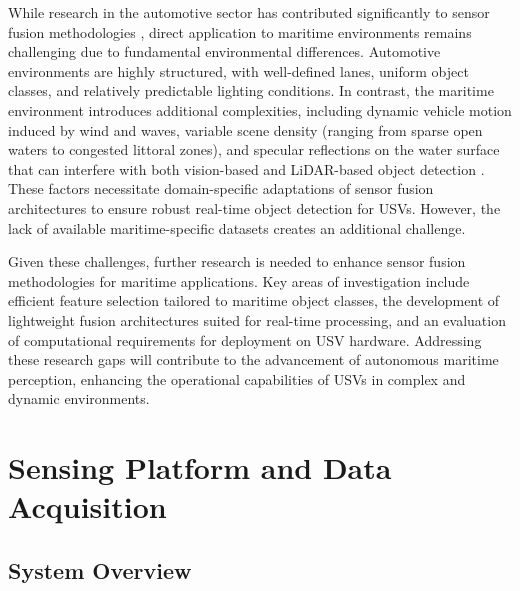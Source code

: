 \documentclass{erauthesis}
\begin{document}
While research in the automotive sector has contributed significantly to sensor fusion methodologies \cite{yeong2021,clunie2021,roriz2022,cui2022,das2022,liu2023a}, direct application to maritime environments remains challenging due to fundamental environmental differences. 
Automotive environments are highly structured, with well-defined lanes, uniform object classes, and relatively predictable lighting conditions. 
In contrast, the maritime environment introduces additional complexities, including dynamic vehicle motion induced by wind and waves, variable scene density (ranging from sparse open waters to congested littoral zones), and specular reflections on the water surface that can interfere with both vision-based \cite{liu2023a} and \ac{LiDAR}-based object detection \cite{ahmed2024}.%
These factors necessitate domain-specific adaptations of sensor fusion architectures to ensure robust real-time object detection for \acp{USV}. 
However, the lack of available maritime-specific datasets \cite{jun-hwa2022,su2023,thompson2023} creates an additional challenge.

Given these challenges, further research is needed to enhance sensor fusion methodologies for maritime applications. 
Key areas of investigation include efficient feature selection tailored to maritime object classes, the development of lightweight fusion architectures suited for real-time processing, and an evaluation of computational requirements for deployment on \ac{USV} hardware. 
Addressing these research gaps will contribute to the advancement of autonomous maritime perception, enhancing the operational capabilities of \acp{USV} in complex and dynamic environments.

\chapter{Sensing Platform and Data Acquisition} \label{sensing_platform}
\section{System Overview}
\end{document}
